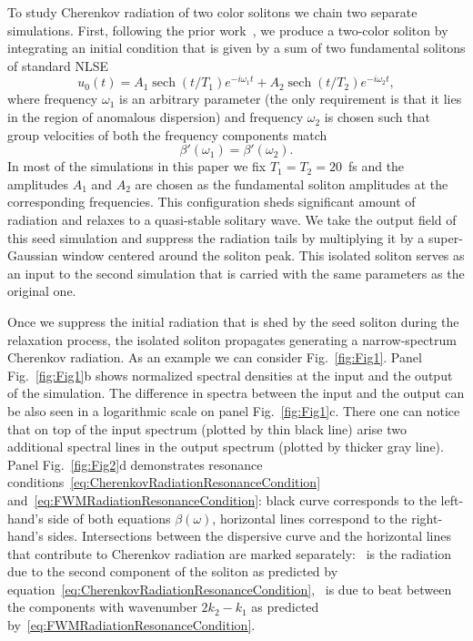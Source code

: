 \documentclass[aps, prl, twocolumn, superscriptaddress, final]{revtex4}
\DeclareMathOperator{\sech}{sech}
\newcommand*\circled[1]{
  \tikz[baseline=(char.base)]{
    \node[shape=circle,draw,inner sep=0.5pt] (char) {#1};
  }
}
\begin{document}
To study Cherenkov radiation of two color solitons we chain two separate simulations. First, following the prior work~\cite{melchert2019soliton}, we produce a two-color soliton by integrating an initial condition that is given by a sum of two fundamental solitons of standard NLSE
\begin{equation}
  \label{eq:SeedInitialCondition}
  u_{0}(t) =
      A_{1} \sech(t / T_{1}) e^{-i \omega_{1} t} +
      A_{2} \sech(t / T_{2}) e^{-i \omega_{2} t},
\end{equation}
where frequency $\omega_{1}$ is an arbitrary parameter (the only requirement is that it lies in the region of anomalous dispersion) and frequency $\omega_{2}$ is chosen such that group velocities of both the frequency components match
\begin{equation*}
  \beta'(\omega_{1}) = \beta'(\omega_{2}).
\end{equation*}
In most of the simulations in this paper we fix $T_{1} = T_{2} = 20$~fs and the amplitudes $A_{1}$ and $A_{2}$ are chosen as the fundamental soliton amplitudes at the corresponding frequencies. This configuration sheds significant amount of radiation and relaxes to a quasi-stable solitary wave. We take the output field of this seed simulation and suppress the radiation tails by multiplying it by a super-Gaussian window centered around the soliton peak. This isolated soliton serves as an input to the second simulation that is carried with the same parameters as the original one.

Once we suppress the initial radiation that is shed by the seed soliton during the relaxation process, the isolated soliton propagates generating a narrow-spectrum Cherenkov radiation. As an example we can consider Fig.~\ref{fig:Fig1}. Panel Fig.~\ref{fig:Fig1}b shows normalized spectral densities at the input and the output of the simulation. The difference in spectra between the input and the output can be also seen in a logarithmic scale on panel Fig.~\ref{fig:Fig1}c. There one can notice that on top of the input spectrum (plotted by thin black line) arise two additional spectral lines in the output spectrum (plotted by thicker gray line). Panel Fig.~\ref{fig:Fig2}d demonstrates resonance conditions~\eqref{eq:CherenkovRadiationResonanceCondition} and~\eqref{eq:FWMRadiationResonanceCondition}: black curve corresponds to the left-hand's side of both equations $\beta(\omega)$, horizontal lines correspond to the right-hand's sides. Intersections between the dispersive curve and the horizontal lines that contribute to Cherenkov radiation are marked separately: \circled{1}~is the radiation due to the second component of the soliton as predicted by equation~\eqref{eq:CherenkovRadiationResonanceCondition}, \circled{2}~is due to beat between the components with wavenumber $2 k_{2} - k_{1}$ as predicted by~\eqref{eq:FWMRadiationResonanceCondition}.
\end{document}
